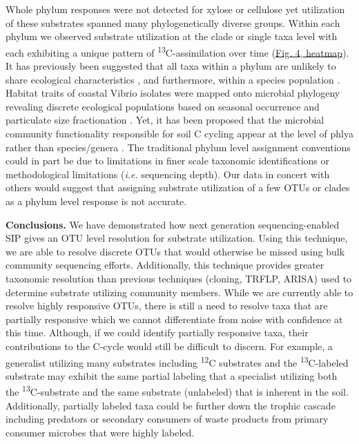 Whole phylum responses were not detected for xylose or cellulose yet utilization of these substrates spanned many phylogenetically diverse groups. Within each phylum we observed substrate utilization at the clade or single taxa level with each exhibiting a unique pattern of \textsuperscript{13}C-assimilation over time (\href{https://authorea.com/users/3537/articles/3612/master/file/figures/bacteria_tree/bacteria_tree.png}{Fig. 4, heatmap}). It has previously been suggested that all taxa within a phylum are unlikely to share ecological characteristics \cite{Fierer_2007}, and furthermore, within a species population \cite{Choudoir_2012,Preheim_2011,Hunt_2008}. Habitat traits of coastal Vibrio isolates were mapped onto microbial phylogeny revealing discrete ecological populations based on seasonal occurrence and particulate size fractionation \cite{Preheim_2011,Hunt_2008}. Yet, it has been proposed that the microbial community functionality responsible for soil C cycling appear at the level of phlya rather than species/genera \cite{Schimel_2012}. The traditional phylum level assignment conventions could in part be due to limitations in finer scale taxonomic identifications or methodological limitations (\textit{i.e.} sequencing depth). Our data in concert with others \cite{Goldfarb_2011,Fierer_2007,Choudoir_2012,Preheim_2011,Hunt_2008} would suggest that assigning substrate utilization of a few OTUs or clades as a phylum level response is not accurate.

\textbf{Conclusions.} We have demonstrated how next generation sequencing-enabled SIP gives an OTU level resolution for substrate utilization. Using this technique, we are able to resolve discrete OTUs that would otherwise be missed using bulk community sequencing efforts. Additionally, this technique provides greater taxonomic resolution than previous techniques (cloning, TRFLP, ARISA) used to determine substrate utilizing community members. While we are currently able to resolve highly responsive OTUs, there is still a need to resolve taxa that are partially responsive which we cannot differentiate from noise with confidence at this time. Although, if we could identify partially responsive taxa, their contributions to the C-cycle would still be difficult to discern. For example, a generalist utilizing many substrates including \textsuperscript{12}C substrates and the \textsuperscript{13}C-labeled substrate may exhibit the same partial labeling that a specialist utilizing both the \textsuperscript{13}C-substrate and the same substrate (unlabeled) that is inherent in the soil. Additionally, partially labeled taxa could be further down the trophic cascade including predators or secondary consumers of waste products from primary consumer microbes that were highly labeled.   

